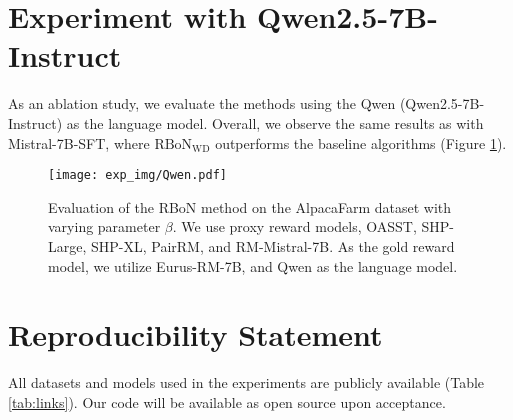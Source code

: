 \section{Experiment with Qwen2.5-7B-Instruct}
As an ablation study, we evaluate the methods using the Qwen (Qwen2.5-7B-Instruct) as the language model. Overall, we observe the same results as with Mistral-7B-SFT, where $\mathrm{RBoN}_{\mathrm{WD}}$ outperforms the baseline algorithms (Figure \ref{fig:qwen}).


\begin{figure}[htbp]
    \centering
    \texttt{[image: exp\_img/Qwen.pdf]}
    \caption{Evaluation of the RBoN method on the AlpacaFarm dataset with varying parameter $\beta$. We use proxy reward models, OASST, SHP-Large, SHP-XL,  PairRM, and RM-Mistral-7B. As the gold reward model, we utilize Eurus-RM-7B, and Qwen as the language model.
    }
    \label{fig:qwen}
\end{figure}


\newpage
\section{Reproducibility Statement}
\label{appendix:reprod}

All datasets and models used in the experiments are publicly available (Table \ref{tab:links}). Our code will be available
as open source upon acceptance.


